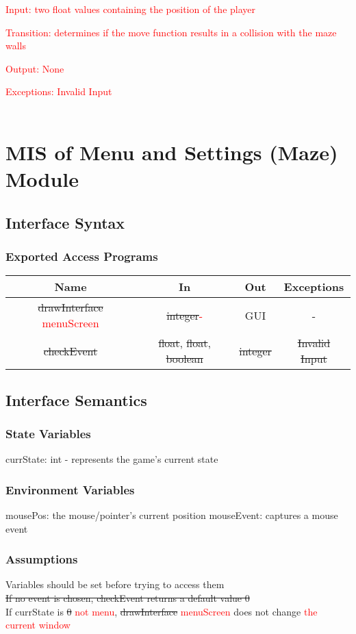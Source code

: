 \documentclass[12pt, titlepage]{article}
\begin{document}
		\textcolor{red}{Input: two float values containing the position of the player}
		
		\textcolor{red}{Transition: determines if the move function results in a collision with the maze walls}
		
		\textcolor{red}{Output: None}
		
		\textcolor{red}{Exceptions: Invalid Input}\\
        \\
\section{MIS of Menu and Settings (Maze) Module}
		\subsection{Interface Syntax}
		\subsubsection{Exported Access Programs}
		\begin{tabular}[pos]{|c|c|c|c|}
			\hline
			\textbf{Name}& \textbf{In} & \textbf{Out} & \textbf{Exceptions} \\ \hline
		    \sout{drawInterface} \textcolor{red}{menuScreen} & \sout{integer}\textcolor{red}{-} & GUI & - \\ \hline
			\sout{checkEvent} & \sout{float}, \sout{float}, \sout{boolean} & \sout{integer} & \sout{Invalid Input} \\ \hline
			
		\end{tabular}
		
		\subsection{Interface Semantics}
		\subsubsection{State Variables}
		currState: int - represents the game's current state
		
		\subsubsection{Environment Variables}
		mousePos: the mouse/pointer's current position
		mouseEvent: captures a mouse event 
		\subsubsection{Assumptions}
		Variables should be set before trying to access them \\ 
		\sout{If no event is chosen, checkEvent returns a default value 0} \\
		If currState is \sout{0} \textcolor{red}{not menu}, \sout{drawInterface} \textcolor{red}{menuScreen} does not change \textcolor{red}{the current window} \\
		
\end{document}
